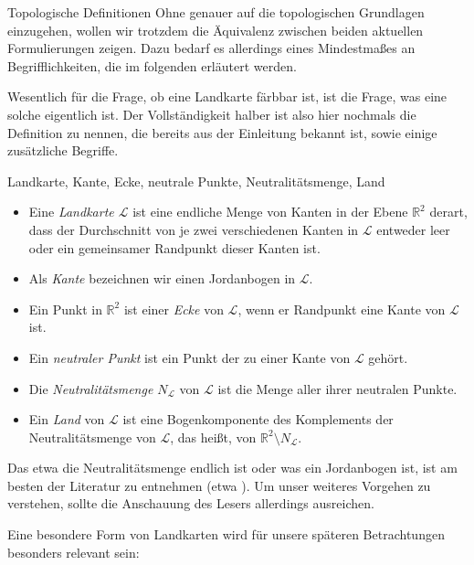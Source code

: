 \begin{section}{Topologische Definitionen}
 Ohne genauer auf die topologischen Grundlagen einzugehen, wollen wir trotzdem die Äquivalenz zwischen beiden aktuellen Formulierungen zeigen. Dazu bedarf es allerdings eines Mindestmaßes an Begrifflichkeiten, die im folgenden erläutert werden.
 
 Wesentlich für die Frage, ob eine Landkarte färbbar ist, ist die Frage, was eine solche eigentlich ist. Der Vollständigkeit halber ist also hier nochmals die Definition zu nennen, die bereits aus der Einleitung bekannt ist, sowie einige zusätzliche Begriffe.
 
 \begin{definition}{Landkarte, Kante, Ecke, neutrale Punkte, Neutralitätsmenge, Land}
  \-\ 
  \begin{itemize}
    \item Eine \textit{Landkarte $\mathcal{L}$} ist eine endliche Menge von Kanten in der Ebene $\mathbb{R}^2$ derart, dass der Durchschnitt von je zwei verschiedenen Kanten in $\mathcal{L}$ entweder leer oder ein gemeinsamer Randpunkt dieser Kanten ist. 
    \item Als \textit{Kante} bezeichnen wir einen Jordanbogen in $\mathcal{L}$.
    \item Ein Punkt in $\mathbb{R}^2$ ist einer \textit{Ecke} von $\mathcal{L}$, wenn er Randpunkt eine Kante von $\mathcal{L}$ ist. 
    \item Ein \textit{neutraler Punkt} ist ein Punkt der zu einer Kante von $\mathcal{L}$ gehört.
    \item Die \textit{Neutralitätsmenge $N_{\mathcal{L}}$} von $\mathcal{L}$ ist die Menge aller ihrer neutralen Punkte. 
    \item Ein \textit{Land} von $\mathcal{L}$ ist eine Bogenkomponente des Komplements der Neutralitätsmenge von $\mathcal{L}$, das heißt, von $\mathbb{R}^2 \setminus N_{\mathcal{L}}$.
  \end{itemize}
 \end{definition}
 
 Das etwa die Neutralitätsmenge endlich ist oder was ein Jordanbogen ist, ist am besten der Literatur zu entnehmen (etwa \cite[Kapitel 2]{fritsch}). Um unser weiteres Vorgehen zu verstehen, sollte die Anschauung des Lesers allerdings ausreichen.
 
 Eine besondere Form von Landkarten wird für unsere späteren Betrachtungen besonders relevant sein:
 

\end{section}
